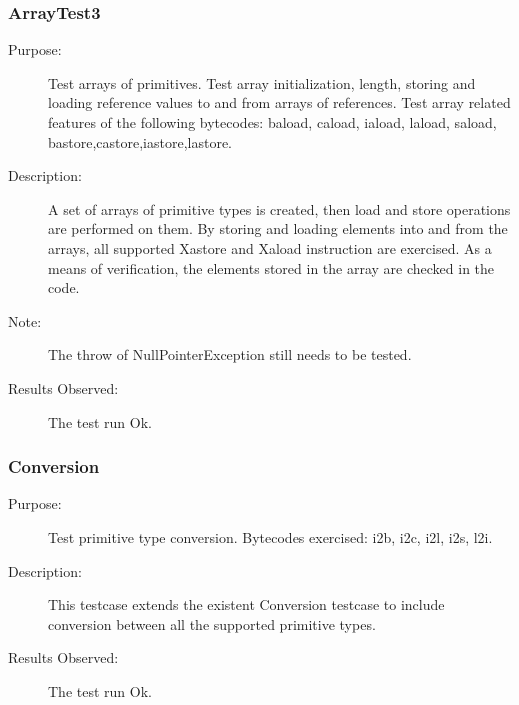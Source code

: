 \subsubsection{ArrayTest3}
\begin{description}
   \item[Purpose:]
Test arrays of primitives. Test array initialization, length,
storing and loading reference values to and from arrays of
references. Test array related features of the following bytecodes:
baload, caload, iaload, laload, saload,
bastore,castore,iastore,lastore.
   \item[Description:]
A set of arrays of primitive types is created, then load and store
operations are performed on them. By storing and loading elements
into and from the arrays, all supported Xastore and Xaload
instruction are exercised. As a means of verification, the elements
stored in the array are checked in the code.
  \item[Note:]
The throw of NullPointerException still needs to be tested.
   \item[Results Observed:]
The test run Ok.
\end{description}

\subsubsection{Conversion}
\begin{description}
   \item[Purpose:]
Test primitive type conversion. Bytecodes exercised: i2b, i2c, i2l,
i2s, l2i.
   \item[Description:]
This testcase extends the existent Conversion testcase to include
conversion between all the supported primitive types.
   \item[Results Observed:]
The test run Ok.
\end{description}
